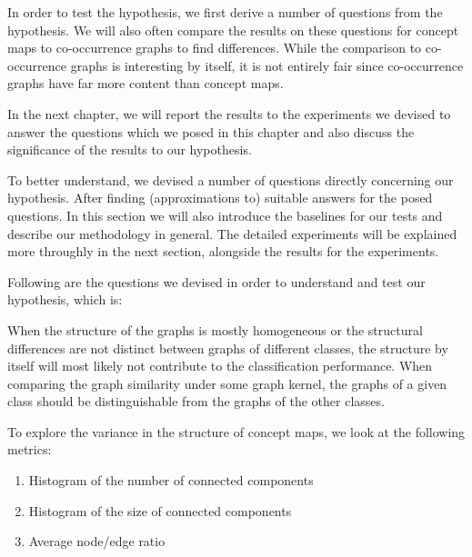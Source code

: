 In order to test the hypothesis, we first derive a number of questions from the hypothesis.
We will also often compare the results on these questions for concept maps to co-occurrence graphs to find differences. While the comparison to co-occurrence graphs is interesting by itself, it is not entirely fair since co-occurrence graphs have far more content than concept maps.

In the next chapter, we will report the results to the experiments we devised to answer the questions which we posed in this chapter and also discuss the significance of the results to our hypothesis.


To better understand, we devised a number of questions directly concerning our hypothesis.
After finding (approximations to) suitable answers for the posed questions.
In this section we will also introduce the baselines for our tests and describe our methodology in general.
The detailed experiments will be explained more throughly in the next section, alongside the results for the experiments.

Following are the questions we devised in order to understand and test our hypothesis, which is:
\begin{quote}%
\hypothesis%
\end{quote}


When the structure of the graphs is mostly homogeneous or the structural differences are not distinct between graphs of different classes, the structure by itself will most likely not contribute to the classification performance.
When comparing the graph similarity under some graph kernel, the graphs of a given class should be distinguishable from the graphs of the other classes.

To explore the variance in the structure of concept maps, we look at the following metrics:
\begin{enumerate}
    \item{Histogram of the number of connected components}
    \item{Histogram of the size of connected components}
    \item{Average node/edge ratio}
\end{enumerate}

